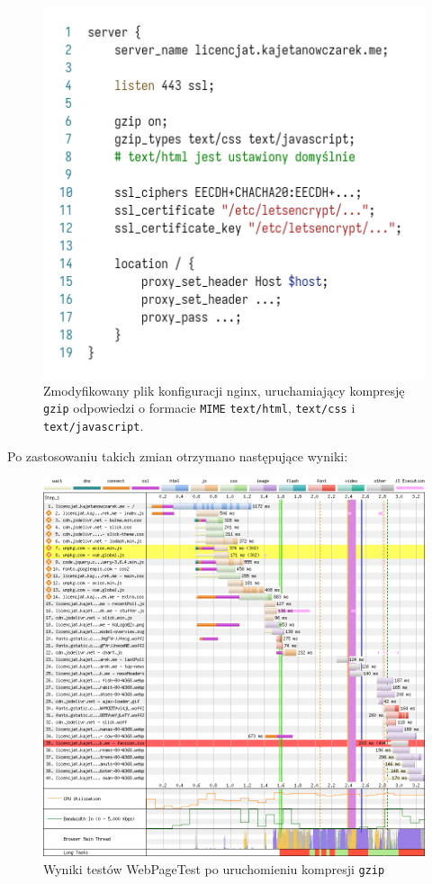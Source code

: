 \documentclass[licencjacka]{pracadypl}
\begin{document}
\begin{figure}[H]
  \centering
  \includegraphics[width=\linewidth/\real{1.55}]{images/code-nginx-conf-trunc-gzip.png}
  \caption{Zmodyfikowany plik konfiguracji nginx, uruchamiający kompresję \texttt{gzip} odpowiedzi o formacie \texttt{MIME} \texttt{text/html}, \texttt{text/css} i \texttt{text/javascript}.}
  \label{fig:nginx-after-gzip}
\end{figure}

Po zastosowaniu takich zmian otrzymano następujące wyniki:
\begin{figure}[H]
  \includegraphics[width=\linewidth]{images/waterfall-after-gzip.png}
  \caption{Wyniki testów WebPageTest po uruchomieniu kompresji \texttt{gzip}}
  \label{fig:waterfall-after-gzip}
\end{figure}
\end{document}
